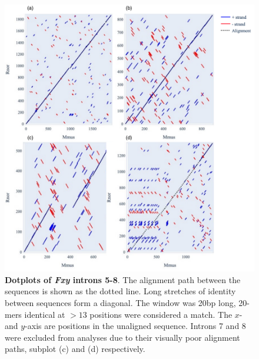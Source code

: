 \begin{figure}[htbp]
\centering
\includegraphics[width=\textwidth]{figures/diagrams/fxy_dotplot_2.pdf}
\caption[Dotplots of \textit{Fxy} introns 5-8]{ \textbf{Dotplots of \textit{Fxy} introns 5-8}.  The alignment path between the sequences is shown as the dotted line. Long stretches of identity between sequences form a diagonal. The window was 20bp long, 20-mers identical at $>13$ positions were considered a match. The $x$- and $y$-axis are positions in the unaligned sequence. Introns 7 and 8 were excluded from analyses due to their  visually poor alignment paths, subplot (c) and (d) respectively. }
\label{fig:Fxy-dp-2}
\end{figure}